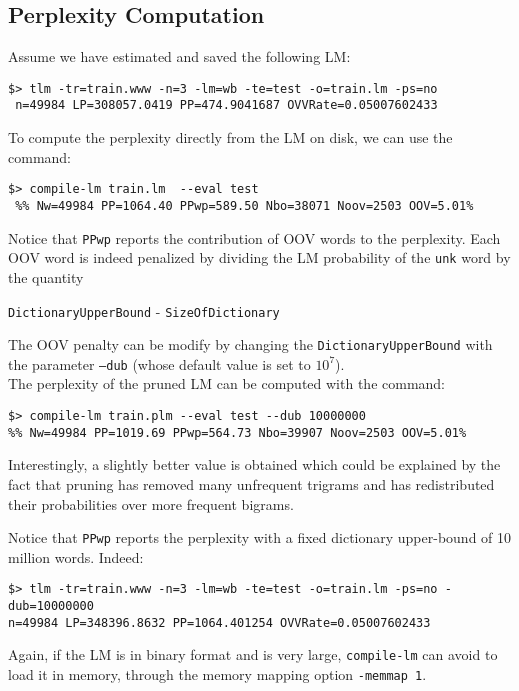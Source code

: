 \documentclass[11pt]{article}
\begin{document}
\subsection{Perplexity Computation}
Assume we have estimated and saved the following LM:

\begin{verbatim}
$> tlm -tr=train.www -n=3 -lm=wb -te=test -o=train.lm -ps=no
 n=49984 LP=308057.0419 PP=474.9041687 OVVRate=0.05007602433
\end{verbatim}

\noindent
To compute the perplexity directly from the LM on disk, we can use the command:

\begin{verbatim}
$> compile-lm train.lm  --eval test
 %% Nw=49984 PP=1064.40 PPwp=589.50 Nbo=38071 Noov=2503 OOV=5.01%
\end{verbatim}
Notice that {\tt PPwp} reports the contribution of OOV words to the perplexity. Each OOV word is indeed penalized by dividing the
LM probability of the {\tt unk} word by  the quantity


\centerline{{\tt DictionaryUpperBound} - {\tt SizeOfDictionary}}

\noindent
The OOV penalty can be modify by changing the {\tt DictionaryUpperBound} with the parameter {\tt --dub} (whose default value is set to $10^7$). \\

\noindent
The perplexity of the pruned LM can be computed with the command:
\begin{verbatim}
$> compile-lm train.plm --eval test --dub 10000000
%% Nw=49984 PP=1019.69 PPwp=564.73 Nbo=39907 Noov=2503 OOV=5.01%
\end{verbatim}
Interestingly, a slightly better value is obtained which could be explained by the 
fact that pruning has removed many unfrequent trigrams and has redistributed 
their probabilities over more frequent bigrams.

\noindent
Notice that {\tt PPwp} reports the perplexity with a fixed dictionary upper-bound of 10 million words. Indeed:
\begin{verbatim}
$> tlm -tr=train.www -n=3 -lm=wb -te=test -o=train.lm -ps=no -dub=10000000 
n=49984 LP=348396.8632 PP=1064.401254 OVVRate=0.05007602433
\end{verbatim}

\bigskip
\noindent
Again, if the LM is in binary format and is very large, {\tt compile-lm} can avoid to load it in memory,
through the memory mapping option {\tt -memmap 1}.
\end{document}
